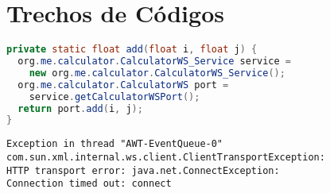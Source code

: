 %

\chapter{Trechos de Códigos}
\label{sec:codigos}

\begin{lstlisting}[caption=Operação de chamada ao WebService,label=cod:add,language=Java]
private static float add(float i, float j) {
  org.me.calculator.CalculatorWS_Service service = 
    new org.me.calculator.CalculatorWS_Service();
  org.me.calculator.CalculatorWS port = 
    service.getCalculatorWSPort();
  return port.add(i, j);
}
\end{lstlisting}





\begin{lstlisting}[caption=Erro de transporte HTTP,label=cod:httperror]
Exception in thread "AWT-EventQueue-0" 
com.sun.xml.internal.ws.client.ClientTransportException: 
HTTP transport error: java.net.ConnectException: 
Connection timed out: connect
\end{lstlisting}












